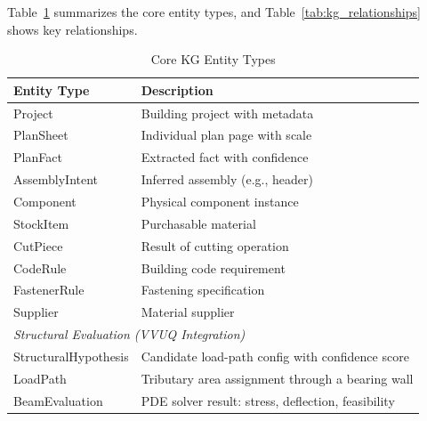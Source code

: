 Table~\ref{tab:kg_entities} summarizes the core entity types, and Table~\ref{tab:kg_relationships} shows key relationships.

\begin{table}[ht]
\centering
\caption{Core KG Entity Types}
\label{tab:kg_entities}
\begin{tabular}{ll}
\toprule
\textbf{Entity Type} & \textbf{Description} \\
\midrule
Project & Building project with metadata \\
PlanSheet & Individual plan page with scale \\
PlanFact & Extracted fact with confidence \\
AssemblyIntent & Inferred assembly (e.g., header) \\
Component & Physical component instance \\
StockItem & Purchasable material \\
CutPiece & Result of cutting operation \\
CodeRule & Building code requirement \\
FastenerRule & Fastening specification \\
Supplier & Material supplier \\
\midrule
\multicolumn{2}{l}{\textit{Structural Evaluation (VVUQ Integration)}} \\
\midrule
StructuralHypothesis & Candidate load-path config with confidence score \\
LoadPath & Tributary area assignment through a bearing wall \\
BeamEvaluation & PDE solver result: stress, deflection, feasibility \\
\bottomrule
\end{tabular}
\end{table}

